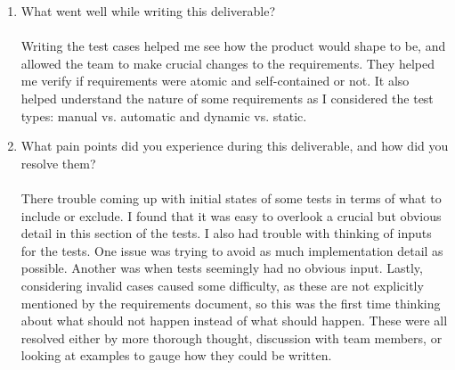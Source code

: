 \documentclass[12pt, titlepage]{article}
\begin{document}
\begin{enumerate}
  \item What went well while writing this deliverable?\\\\
  Writing the test cases helped me see how the product would shape to 
  be, and allowed the team to make crucial changes to the requirements. 
  They helped me verify if requirements were atomic and self-contained 
  or not. It also helped understand the nature of some requirements as 
  I considered the test types: manual vs. automatic and dynamic vs. 
  static.  
  \item What pain points did you experience during this deliverable, and how
  did you resolve them?\\\\
  There trouble coming up with initial states of some tests in terms of 
  what to include or exclude. I found that it was easy to overlook a 
  crucial but obvious detail in this section of the tests. I also had 
  trouble with thinking of inputs for the tests. One issue was trying 
  to avoid as much implementation detail as possible. Another was 
  when tests seemingly had no obvious input. Lastly, considering 
  invalid cases caused some difficulty, as these are not explicitly 
  mentioned by the requirements document, so this was the first time 
  thinking about what should not happen instead of what should happen.
  These were all resolved either by more thorough thought, discussion 
  with team members, or looking at examples to gauge how they could be 
  written.
\end{enumerate}
\end{document}
